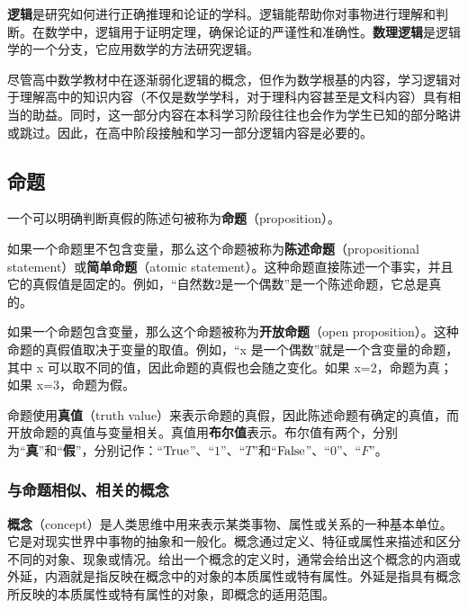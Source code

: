 
\begin{issues}
\issueDraft
\end{issues}

\textbf{逻辑}是研究如何进行正确推理和论证的学科。逻辑能帮助你对事物进行理解和判断。在数学中，逻辑用于证明定理，确保论证的严谨性和准确性。\textbf{数理逻辑}是逻辑学的一个分支，它应用数学的方法研究逻辑。

尽管高中数学教材中在逐渐弱化逻辑的概念，但作为数学根基的内容，学习逻辑对于理解高中的知识内容（不仅是数学学科，对于理科内容甚至是文科内容）具有相当的助益。同时，这一部分内容在本科学习阶段往往也会作为学生已知的部分略讲或跳过。因此，在高中阶段接触和学习一部分逻辑内容是必要的。

\subsection{命题}

一个可以明确判断真假的陈述句被称为\textbf{命题}（proposition）。

如果一个命题里不包含变量，那么这个命题被称为\textbf{陈述命题}（propositional statement）或\textbf{简单命题}（atomic statement）。这种命题直接陈述一个事实，并且它的真假值是固定的。例如，“自然数2是一个偶数”是一个陈述命题，它总是真的。

如果一个命题包含变量，那么这个命题被称为\textbf{开放命题}（open proposition）。这种命题的真假值取决于变量的取值。例如，“x 是一个偶数”就是一个含变量的命题，其中 x 可以取不同的值，因此命题的真假也会随之变化。如果 x=2，命题为真；如果 x=3，命题为假。

命题使用\textbf{真值}（truth value）来表示命题的真假，因此陈述命题有确定的真值，而开放命题的真值与变量相关。真值用\textbf{布尔值}表示。布尔值有两个，分别为“\textbf{真}”和“\textbf{假}”，分别记作：“${\rm True}$”、“$1$”、“$T$”和“${\rm False}$”、“$0$”、“$F$”。

\subsubsection{与命题相似、相关的概念}

\textbf{概念}（concept）是人类思维中用来表示某类事物、属性或关系的一种基本单位。它是对现实世界中事物的抽象和一般化。概念通过定义、特征或属性来描述和区分不同的对象、现象或情况。给出一个概念的定义时，通常会给出这个概念的内涵或外延，内涵就是指反映在概念中的对象的本质属性或特有属性。外延是指具有概念所反映的本质属性或特有属性的对象，即概念的适用范围。

